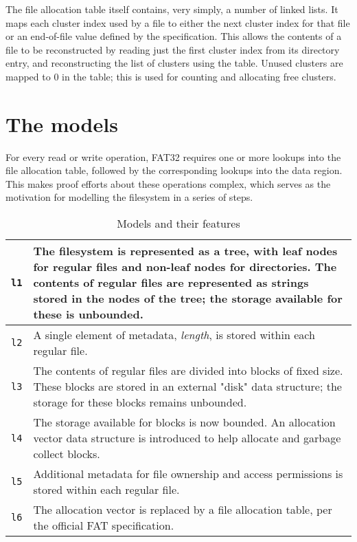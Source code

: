 \documentclass[runningheads,a4paper]{llncs}
\begin{document}
The file allocation table itself contains, very simply, a number of
linked lists. It maps each cluster index used by a file to either the
next cluster index for that file or an end-of-file value defined by the
specification. This allows the contents of a file to be reconstructed
by reading just the first cluster index from its directory entry, and
reconstructing the list of clusters using the table. Unused clusters
are mapped to 0 in the table; this is used for counting and allocating
free clusters.

\section{The models}

For every read or write operation, FAT32 requires one or more lookups
into the file allocation table, followed by the corresponding lookups
into the data region. This makes proof efforts about these operations
complex, which serves as the motivation for modelling the filesystem
in a series of steps.

\begin{table}[]
  \centering
  \caption{Models and their features}
  \label{model-description-table}
  \begin{tabular}{|l|p{120mm}|}
    \hline
    \texttt{l1} & The filesystem is represented as a tree, with leaf
    nodes for regular files and non-leaf nodes for
    directories. The contents of regular files are represented as
    strings stored in the nodes of the tree; the storage available for
    these is unbounded. \\ \hline
    \texttt{l2} & A single element of metadata, \textit{length}, is
    stored within each regular file.  \\ \hline
    \texttt{l3} & The contents of regular files are divided into
    blocks of fixed size. These blocks are stored in an external
    "disk" data structure; the storage for these blocks remains
    unbounded. \\ \hline
    \texttt{l4} & The storage available for blocks is now bounded. An
    allocation vector data structure is introduced to help allocate
    and garbage collect blocks. \\ \hline
    \texttt{l5} & Additional metadata for file ownership and access
    permissions is stored within each regular file. \\ \hline
    \texttt{l6} & The allocation vector is replaced by a file
    allocation table, per the official FAT specification. \\ \hline
  \end{tabular}
\end{table}
\end{document}
